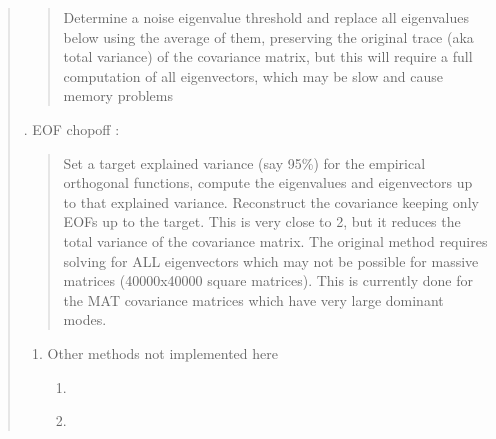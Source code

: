 \documentclass[letterpaper,10pt,english]{sphinxmanual}
\begin{document}
\begin{quote}
\begin{quote}
\sphinxAtStartPar
Determine a noise eigenvalue threshold and replace all eigenvalues below
using the average of them, preserving the original trace (aka total
variance) of the covariance matrix, but this will require a full
computation of all eigenvectors, which may be slow and cause memory
problems
\end{quote}

. EOF chop\sphinxhyphen{}off \sphinxhyphen{}
{\hyperref[\detokenize{misc:glomar_gridding.covariance_tools.eof_chop}]{}}:
\begin{quote}

\sphinxAtStartPar
Set a target explained variance (say 95\%) for the empirical orthogonal
functions, compute the eigenvalues and eigenvectors up to that explained
variance. Reconstruct the covariance keeping only EOFs up to the target.
This is very close to 2, but it reduces the total variance of the
covariance matrix. The original method requires solving for ALL
eigenvectors which may not be possible for massive matrices
(40000x40000 square matrices). This is currently done for the MAT
covariance matrices which have very large dominant modes.
\end{quote}
\begin{enumerate}
%
\setcounter{enumi}{3}
\item {}
\sphinxAtStartPar
Other methods not implemented here
\begin{enumerate}
%
\item {} \begin{description}
\sphinxAtStartPar
{}

\end{description}

\item {} \begin{description}
\sphinxAtStartPar
{}

\sphinxAtStartPar
{}

\end{description}

\end{enumerate}

\end{enumerate}
\end{quote}
\end{document}
